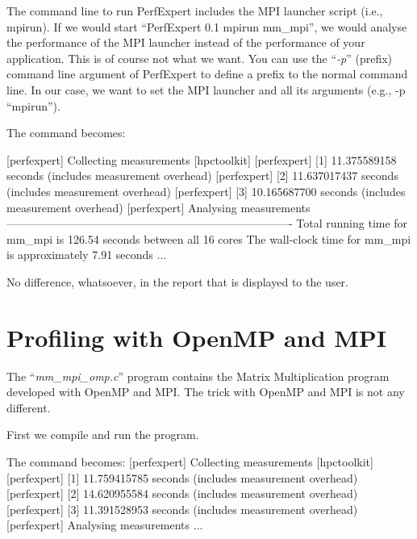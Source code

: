 \begin{prompt}
\end{prompt}

The command line to run PerfExpert includes the MPI launcher script (i.e., mpirun). If we would start ``PerfExpert 0.1 mpirun mm\_mpi'', we would analyse the performance of the MPI launcher instead of the performance of your application. This is of course not what we want. You can use the ``\textit{-p}'' (prefix) command line argument of PerfExpert to define a prefix to the normal command line. In our case, we want to set the MPI launcher and all its arguments (e.g., -p
``mpirun'').

The command becomes:

\begin{prompt}
[perfexpert] Collecting measurements [hpctoolkit]
[perfexpert]    [1] 11.375589158 seconds (includes measurement overhead)
[perfexpert]    [2] 11.637017437 seconds (includes measurement overhead)
[perfexpert]    [3] 10.165687700 seconds (includes measurement overhead)
[perfexpert] Analysing measurements
----------------------------------------------------------------------------
Total running time for mm_mpi is 126.54 seconds between all 16 cores
The wall-clock time for mm_mpi is approximately 7.91 seconds
...
\end{prompt}

No difference, whatsoever, in the report that is displayed to the user.

\section{Profiling with OpenMP and MPI}
\label{sec:Profiling_with_OpenMP_MPI}

The ``\textit{mm\_mpi\_omp.c}'' program contains the Matrix Multiplication program developed with OpenMP and MPI. The trick with OpenMP and MPI is not any different.

First we compile and run the program.

\begin{prompt}
The command becomes:
[perfexpert] Collecting measurements [hpctoolkit]
[perfexpert]    [1] 11.759415785 seconds (includes measurement overhead)
[perfexpert]    [2] 14.620955584 seconds (includes measurement overhead)
[perfexpert]    [3] 11.391528953 seconds (includes measurement overhead)
[perfexpert] Analysing measurements
...
\end{prompt}
